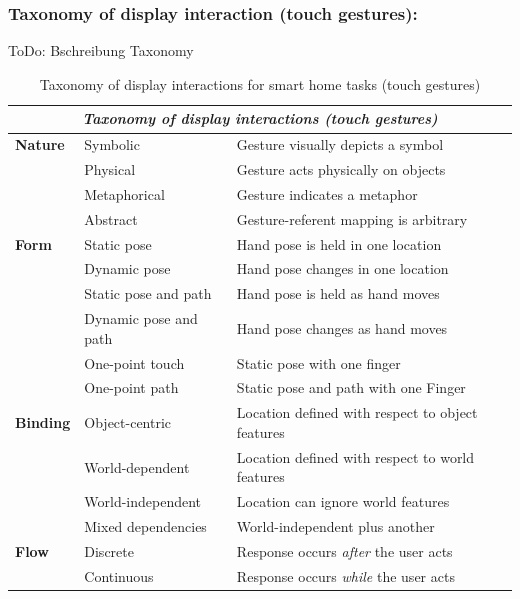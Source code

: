 \documentclass[sigchi]{acmart}
\begin{document}
	\subsubsection{Taxonomy of display interaction (touch gestures):}	
	ToDo: Bschreibung Taxonomy
	\begin{table}[t]
		\begin{center}
			\caption{Taxonomy of display interactions for smart home tasks (touch gestures)}
			\label{tab:taxDisplayTG}
			\begin{footnotesize}
				\begin{tabular}{p{} p{} p{}} \toprule
					\multicolumn{3}{c}{\textit{Taxonomy of display interactions (touch gestures)}} \\ \midrule
					\textbf{Nature}		& Symbolic		& Gesture visually depicts a symbol \\
										& Physical		& Gesture acts physically on objects \\ 
										& Metaphorical 	& Gesture indicates a metaphor \\ 
										& Abstract		& Gesture-referent mapping is arbitrary \\ \midrule
					\textbf{Form} 		& Static pose	& Hand pose is held in one location \\
										& Dynamic pose	& Hand pose changes in one location \\
										& Static pose and path 	& Hand pose is held as hand moves \\
										& Dynamic pose and path	& Hand pose changes as hand moves \\
										& One-point touch	& Static pose with one finger \\ 
										& One-point path	& Static pose and path with one Finger \\ \midrule
					\textbf{Binding}	& Object-centric 	& Location defined with respect to object features \\
										& World-dependent 	& Location defined with respect to world features \\
										& World-independent & Location can ignore world features \\
										& Mixed dependencies	& World-independent plus another \\ \midrule
					\textbf{Flow}		& Discrete		& Response occurs \textit{after} the user acts \\ 
										& Continuous 	& Response occurs \textit{while} the user acts  \\ \bottomrule
				\end{tabular}
			\end{footnotesize}
		\end{center}
	\end{table}
\end{document}
